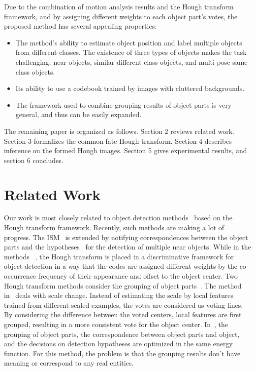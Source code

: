 \documentclass{mva2011}
\begin{document}
Due to the combination of motion analysis results and the Hough transform framework, and by assigning different weights to each object part's votes, the proposed method has several appealing properties:
\begin{itemize}
\item {The method's ability to estimate object position and label multiple objects from different classes. The existence of three types of objects makes the task challenging: near objects, similar different-class objects, and multi-pose same-class objects.}
\item {Its ability to use a codebook trained by images with cluttered backgrounds.}
\item {The framework used to combine grouping results of object parts is very general, and thus can be easily expanded.}
\end{itemize}

The remaining paper is organized as follows. Section 2 reviews related work. Section 3 formalizes the common fate Hough transform. Section 4 describes inference on the formed Hough images. Section 5 gives experimental results, and section 6 concludes.

\section{Related Work}

Our work is most closely related to object detection methods~\cite{ac9,ac22,lb1,ac5,ac10,ac21} based on the Hough transform framework. Recently, such methods are making a lot of  progress. The ISM~\cite{lb1,ac5} is extended  by notifying correspondences between the object parts and the hypotheses~\cite{ac9} for the detection of multiple near objects. While in the methods ~\cite{ac6,ac10,ac7}, the Hough transform is placed in a discriminative framework for object detection in a way that the codes are assigned different weights by the co-occurrence frequency of their appearance and offset to the object center.
Two Hough transform methods consider the grouping of object parts~\cite{ac26,ac25}. The method in~\cite{ac26} deals with scale change. Instead of estimating the scale by local features trained from different scaled examples, the votes are considered as voting lines. By considering the difference between the voted centers, local features are first grouped, resulting in a more consistent vote for the object center. In~\cite{ac25}, the grouping of object parts, the correspondence between object parts and object, and the decisions on detection hypotheses are optimized in the same energy function. For this method, the problem is that the grouping results don't have meaning or correspond to any real entities.
\end{document}
